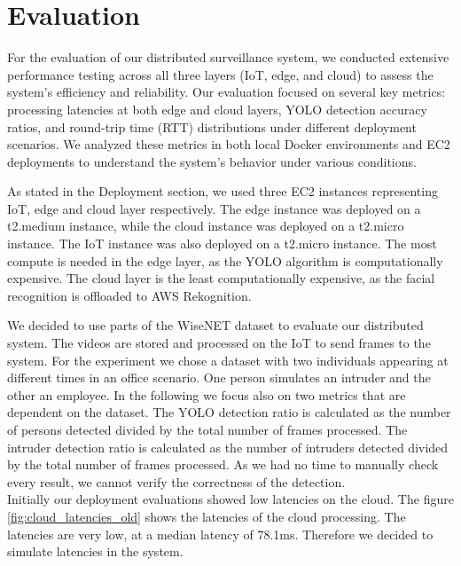 \documentclass[conference]{IEEEtran}
\begin{document}
\section{Evaluation}
For the evaluation of our distributed surveillance system, we conducted extensive performance testing across all three layers (IoT, edge, and cloud) to assess the system's efficiency and reliability. Our evaluation focused on several key metrics: processing latencies at both edge and cloud layers, YOLO detection accuracy ratios, and round-trip time (RTT) distributions under different deployment scenarios. We analyzed these metrics in both local Docker environments and EC2 deployments to understand the system's behavior under various conditions. 

As stated in the Deployment section, we used three EC2 instances representing IoT, edge and cloud layer respectively.  The edge instance was deployed on a t2.medium instance, while the cloud instance was deployed on a t2.micro instance. The IoT instance was also deployed on a t2.micro instance. 
The most compute is needed in the edge layer, as the YOLO algorithm is computationally expensive. The cloud layer is the least computationally expensive, as the facial recognition is offloaded to AWS Rekognition. 

We decided to use parts of the WiseNET dataset to evaluate our distributed system. The videos are stored and processed on the IoT to send frames to the system. For the experiment we chose a dataset with two individuals appearing at different times in an office scenario.  One person simulates an intruder and the other an employee.
In the following we focus also on two metrics that are dependent on the dataset. The YOLO detection ratio is calculated as the number of persons detected divided by the total number of frames processed. The intruder detection ratio is calculated as the number of intruders detected divided by the total number of frames processed. 
As we had no time to manually check every result, we cannot verify the correctness of the detection. 
\\

Initially our deployment evaluations showed low latencies on the cloud. The figure  \ref{fig:cloud_latencies_old} shows the latencies of the cloud processing. The latencies are very low, at a median latency of 78.1ms. Therefore we decided to simulate latencies in the system. 
\end{document}
